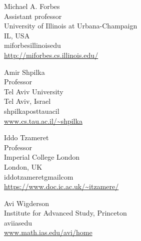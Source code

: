 \documentclass{toc}
\begin{document}
%
%
%
%
%
\begin{tocauthors}
\begin{tocinfo}[forbes]
Michael A. Forbes \\
Assistant professor \\
University of Illinois at Urbana-Champaign\\
IL, USA \\
miforbes\tocat{}illinois\tocdot{}edu \\
\url{http://miforbes.cs.illinois.edu/}
\end{tocinfo}

\begin{tocinfo}[shpilka]
Amir Shpilka\\
Professor\\
Tel Aviv University\\
Tel Aviv, Israel\\
shpilka\tocat{}post\tocdot{}tau\tocdot{}ac\tocdot{}il \\
\url{www.cs.tau.ac.il/~shpilka}
\end{tocinfo}

\begin{tocinfo}[tzameret]
Iddo Tzameret\\
Professor\\
Imperial College London\\
London, UK\\
iddo\tocdot{}tzameret\tocat{}gmail\tocdot{}com \\
\url{https://www.doc.ic.ac.uk/~itzamere/}

\end{tocinfo}

\begin{tocinfo}[wigderson]  %
Avi Wigderson \\
Institute for Advanced Study, Princeton \\
avi\tocat{}ias\tocdot{}edu\\
\url{www.math.ias.edu/avi/home}
\end{tocinfo}
\end{tocauthors}
\end{document}
